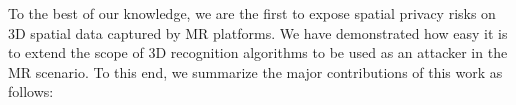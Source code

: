 

To the best of our knowledge, we are the first to expose spatial privacy risks on 3D spatial data captured by MR platforms. We have demonstrated how easy it is to extend the scope of 3D recognition algorithms to be used as an attacker in the MR scenario. To this end, we summarize the major contributions of this work as follows:

